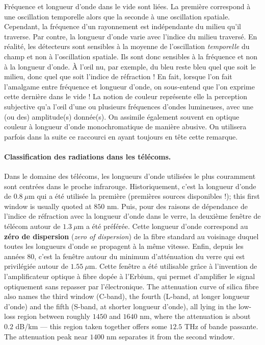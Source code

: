 \begin{remark}
  Fréquence et longueur d'onde dans le vide sont liées. La première correspond à
  une oscillation temporelle alors que la seconde à une oscillation spatiale.
  Cependant, la fréquence d'un rayonnement est indépendante du milieu qu'il
  traverse. Par contre, la longueur d'onde varie avec l'indice du milieu
  traversé. En réalité, les détecteurs sont sensibles à la moyenne de
  l'oscillation \emph{temporelle} du champ et non à l'oscillation spatiale. Ils
  sont donc sensibles à la fréquence et non à la longueur d'onde. À l'œil nu,
  par exemple, du bleu reste bleu quel que soit le milieu, donc quel que soit
  l'indice de réfraction ! En fait, lorsque l'on fait l'amalgame entre fréquence
  et longueur d'onde, on sous-entend que l'on exprime cette dernière dans le
  vide ! La notion de couleur représente elle la perception subjective qu'a
  l'œil d'une ou plusieurs fréquences d'ondes lumineuses, avec une (ou des)
  amplitude(s) donnée(s). On assimile également souvent en optique couleur à
  longueur d'onde monochromatique de manière abusive. On utilisera parfois dans
  la suite ce raccourci en ayant toujours en tête cette remarque.
\end{remark}

\paragraph{Classification des radiations dans les télécoms.} Dans le domaine des
télécoms, les longueurs d'onde utilisées le plus couramment sont centrées dans le
proche infrarouge. Historiquement, c'est la longueur d'onde de $0.8\ \mu$m qui a
été utilisée la première (premières sources disponibles !); this first window is
usually quoted at $850$ nm. Puis, pour des raisons de dépendance de l'indice de
réfraction avec la longueur d'onde dans le verre, la deuxième fenêtre de télécom
autour de $1.3\ \mu$m a été préférée. Cette longueur d'onde correspond au
\textbf{zéro de dispersion} (\textit{zero of dispersion}) de la fibre standard au
voisinage duquel toutes les longueurs d'onde se propagent à la même vitesse.
Enfin, depuis les années 80, c'est la fenêtre autour du minimum d'atténuation du
verre qui est privilégiée autour de $1.55\ \mu$m. Cette fenêtre a été utilisable
grâce à l'invention de l'amplificateur optique à fibre dopée à l'Erbium, qui
permet d'amplifier le signal optiquement sans repasser par l'électronique. The
attenuation curve of silica fibre also names the third window (C-band), the
fourth (L-band, at longer longueur d'onde) and the fifth (S-band, at shorter
longueur d'onde), all lying in the low-loss region between roughly $1450$ and
$1640$ nm, where the attenuation is about $0.2$ dB/km --- this region taken
together offers some $12.5$ THz of bande passante. The attenuation peak near $1400$ nm
separates it from the second window.

